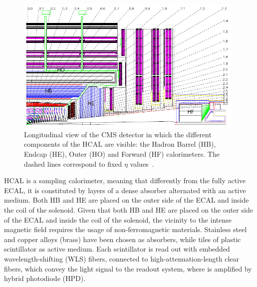 \begin{figure}[hbt]
  \begin{center}
    \includegraphics[width=0.98\textwidth]{figDetector/HCALlayout.png}
    \caption{Longitudinal view of the CMS detector in which the different components of the HCAL are visible:
             the Hadron Barrel (HB), Endcap (HE), Outer (HO) and Forward (HF) calorimeters. 
             The dashed lines correspond to fixed $\eta$ values~\cite{Chatrchyan:2008aa}.} 
    \label{fig:hcalLayout}
  \end{center}
\end{figure}

HCAL is a sampling calorimeter, meaning that differently from the fully active ECAL,
it is constituted by layers of a dense absorber alternated with an active medium.
Both HB and HE are placed on the outer side of the ECAL and inside the coil of the solenoid. 
Given that both HB and HE are placed on the outer side of the ECAL and inside the coil of the solenoid,
the vicinity to the intense magnetic field requires the usage of non-ferromagnetic materials.
Stainless steel and copper alloys (brass) have been chosen as absorbers, while tiles 
of plastic scintillator as active medium. Each scintillator is read out with embedded wavelength-shifting (WLS) fibers, connected to 
high-attenuation-length clear fibers, which convey the light signal to the readout system,
where is amplified by hybrid photodiode (HPD).

